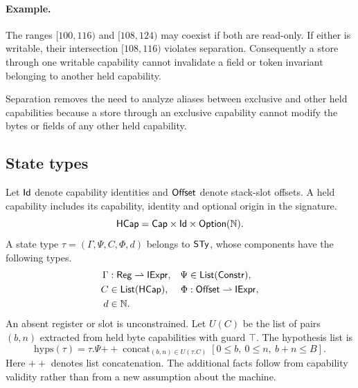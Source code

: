 \paragraph{Example.} The ranges $[100,116)$ and $[108,124)$ may coexist if both are read-only. If either is writable, their intersection $[108,116)$ violates separation. Consequently a store through one writable capability cannot invalidate a field or token invariant belonging to another held capability.


Separation removes the need to analyze aliases between exclusive and other held capabilities because a store through an exclusive capability cannot modify the bytes or fields of any other held capability.

\subsection{State types}
\begin{definition}\label{def:sty}
Let $\mathsf{Id}$ denote capability identities and $\mathsf{Offset}$ denote stack-slot offsets. A held capability includes its capability, identity and optional origin in the signature.
\[
\mathsf{HCap}=\mathsf{Cap}\times\mathsf{Id}\times\mathsf{Option}(\mathbb{N}).
\]
A state type $\tau=(\Gamma,\Psi,C,\Phi,d)$ belongs to $\mathsf{STy}$, whose components have the following types.
\[
\begin{aligned}
\Gamma&:\mathsf{Reg}\rightharpoonup\mathsf{IExpr},&\Psi&\in\mathsf{List}(\mathsf{Constr}),\\
C&\in\mathsf{List}(\mathsf{HCap}),&\Phi&:\mathsf{Offset}\rightharpoonup\mathsf{IExpr},\\
d&\in\mathbb{N}.
\end{aligned}
\]
An absent register or slot is unconstrained. Let $U(C)$ be the list of pairs $(b,n)$ extracted from held byte capabilities with guard $\top$. The hypothesis list is
\[\mathrm{hyps}(\tau)=\tau.\Psi\mathbin{+\!+}\mathop{\mathrm{concat}}_{(b,n)\in U(\tau.C)}[0\le b,\ 0\le n,\ b+n\le B].\]
Here $+\!+$ denotes list concatenation. The additional facts follow from capability validity rather than from a new assumption about the machine.
\end{definition}

